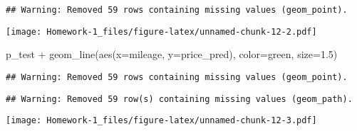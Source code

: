 \documentclass[
]{article}
\newenvironment{Shaded}{\begin{snugshade}}{\end{snugshade}}
\newcommand{\AttributeTok}[1]{\textcolor[rgb]{0.77,0.63,0.00}{#1}}
\newcommand{\FloatTok}[1]{\textcolor[rgb]{0.00,0.00,0.81}{#1}}
\newcommand{\FunctionTok}[1]{\textcolor[rgb]{0.00,0.00,0.00}{#1}}
\newcommand{\NormalTok}[1]{#1}
\newcommand{\SpecialCharTok}[1]{\textcolor[rgb]{0.00,0.00,0.00}{#1}}
\newcommand{\StringTok}[1]{\textcolor[rgb]{0.31,0.60,0.02}{#1}}
\begin{document}
\begin{verbatim}
## Warning: Removed 59 rows containing missing values (geom_point).
\end{verbatim}

\texttt{[image: Homework-1\_files/figure-latex/unnamed-chunk-12-2.pdf]}

\begin{Shaded}
\begin{Highlighting}[]
\NormalTok{p\_test }\SpecialCharTok{+} \FunctionTok{geom\_line}\NormalTok{(}\FunctionTok{aes}\NormalTok{(}\AttributeTok{x=}\NormalTok{mileage, }\AttributeTok{y=}\NormalTok{price\_pred), }\AttributeTok{color=}\StringTok{\textquotesingle{}green\textquotesingle{}}\NormalTok{, }\AttributeTok{size=}\FloatTok{1.5}\NormalTok{)}
\end{Highlighting}
\end{Shaded}

\begin{verbatim}
## Warning: Removed 59 rows containing missing values (geom_point).
\end{verbatim}

\begin{verbatim}
## Warning: Removed 59 row(s) containing missing values (geom_path).
\end{verbatim}

\texttt{[image: Homework-1\_files/figure-latex/unnamed-chunk-12-3.pdf]}
\end{document}
